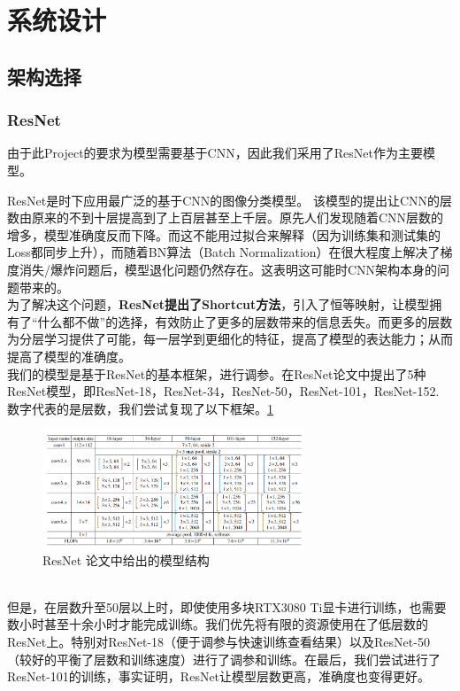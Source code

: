 \documentclass[hyperref, UTF8, 12pt]{article}
\theoremstyle{definition}
\begin{document}
\section{系统设计}
\subsection{架构选择}
\subsubsection{ResNet}
由于此Project的要求为模型需要基于CNN，因此我们采用了ResNet作为主要模型。

ResNet是时下应用最广泛的基于CNN的图像分类模型。\cite{he2015deep} 该模型的提出让CNN的层数由原来的不到十层提高到了上百层甚至上千层。原先人们发现随着CNN层数的增多，模型准确度反而下降。而这不能用过拟合来解释（因为训练集和测试集的Loss都同步上升），而随着BN算法（Batch Normalization）在很大程度上解决了梯度消失/爆炸问题后\cite{batch}，模型退化问题仍然存在。这表明这可能时CNN架构本身的问题带来的。
\\ 
\indent
为了解决这个问题，\textbf{ResNet提出了Shortcut方法}，引入了恒等映射，让模型拥有了“什么都不做”的选择，有效防止了更多的层数带来的信息丢失。而更多的层数为分层学习提供了可能，每一层学到更细化的特征，提高了模型的表达能力；从而提高了模型的准确度。\cite{resnet2016}
\\ 
\indent
我们的模型是基于ResNet的基本框架，进行调参。在ResNet论文\cite{he2015deep}中提出了5种ResNet模型，即ResNet-18，ResNet-34，ResNet-50，ResNet-101，ResNet-152. 数字代表的是层数，我们尝试复现了以下框架。\ref{Fig.resnet1}
\begin{figure}[h] %
	\centering %
	\includegraphics[width=0.7\textwidth]{resnet.png} %
	\caption{ResNet 论文中给出的模型结构} %
	\label{Fig.resnet1} %
\end{figure}
\\
\indent
但是，在层数升至50层以上时，即使使用多块RTX3080 Ti显卡进行训练，也需要数小时甚至十余小时才能完成训练。我们优先将有限的资源使用在了低层数的ResNet上。特别对ResNet-18（便于调参与快速训练查看结果）以及ResNet-50（较好的平衡了层数和训练速度）进行了调参和训练。在最后，我们尝试进行了ResNet-101的训练，事实证明，ResNet让模型层数更高，准确度也变得更好。
\\
\indent
\end{document}
